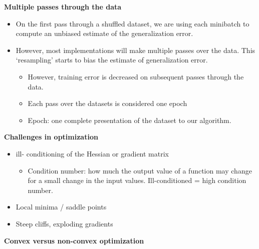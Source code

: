 \documentclass[fontset=fandol,zihao=false,scheme=chinese,heading=true,UTF8]{ctexbook}
\providecommand{\tightlist}{%
  \setlength{\itemsep}{0pt}\setlength{\parskip}{0pt}}
\begin{document}
\textbf{Multiple passes through the data}

\begin{itemize}
\tightlist
\item
  On the first pass through a shuffled dataset, we are using each minibatch to compute an unbiased estimate of the generalization error.
\item
  However, most implementations will make multiple passes over the data. This `resampling' starts to bias the estimate of generalization error.

  \begin{itemize}
  \tightlist
  \item
    However, training error is decreased on subsequent passes through the data.
  \item
    Each pass over the datasets is considered one epoch
  \item
    Epoch: one complete presentation of the dataset to our algorithm.
  \end{itemize}
\end{itemize}

\textbf{Challenges in optimization}

\begin{itemize}
\tightlist
\item
  ill- conditioning of the Hessian or gradient matrix

  \begin{itemize}
  \tightlist
  \item
    Condition number: how much the output value of a function may change for a small change in the input values. Ill-conditioned = high condition number.
  \end{itemize}
\item
  Local minima / saddle points
\item
  Steep cliffs, exploding gradients
\end{itemize}

\textbf{Convex versus non-convex optimization}
\end{document}

